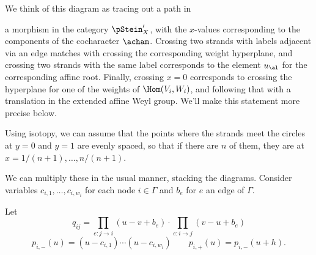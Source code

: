 We think of this diagram as tracing out a path in 


a morphism in the category
$\pStein_X'$, with the $x$-values corresponding to the components of
the cocharacter $\acham$.  Crossing two strands with labels adjacent via an edge
matches with crossing the corresponding weight hyperplane, and
crossing two strands with the same label corresponds to the element
$u_{\al}$ for the corresponding affine root.  Finally, crossing $x=0$
corresponds to crossing the hyperplane for one of the
weights of $\Hom(V_i,W_i)$, and following that
with a translation in the extended affine Weyl group.  We'll make this
statement more precise below.

Using isotopy, we can assume that the points where the
strands meet the circles at $y=0$ and $y=1$ are evenly spaced,
 so that
if there are $n$ of them, they are at $x=1/(n+1), \dots, n/(n+1)$.   

We can multiply these in the usual manner, stacking the diagrams. Consider variables $c_{i,1},\dots, c_{i,w_i}$ for each node $i\in \Gamma$ and $b_e$ for
$e$ an edge of $\Gamma$.

Let \[q_{ij}=\prod_{e\colon  j\to i} (u-v+b_e)\cdot \prod_{e\colon
  i\to j}  (v-u+b_e)\]
\[p_{i,-}(u)=(u-c_{i,1})\cdots (u-c_{i,w_i}) \qquad
p_{i,+}(u)=p_{i,-}(u+h).\] 

